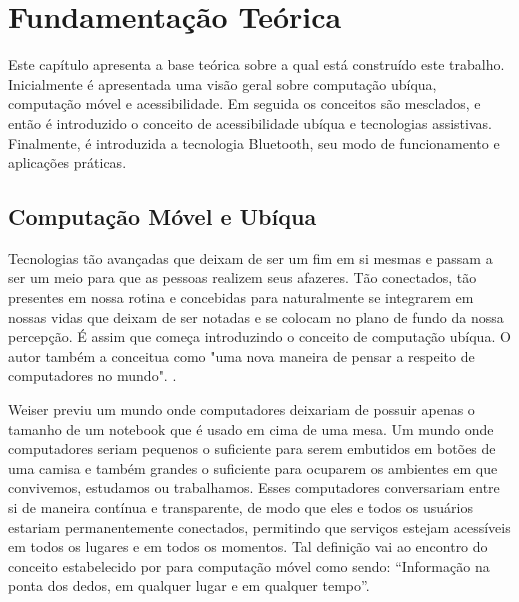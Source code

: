 \documentclass[english,brazilian]{UNISINOSmonografia}
\begin{document}
\chapter{Fundamentação Teórica}
Este capítulo apresenta a base teórica sobre a qual está construído este trabalho. Inicialmente é apresentada uma visão geral sobre computação ubíqua, computação móvel e acessibilidade. Em seguida os conceitos são mesclados, e então é introduzido o conceito de acessibilidade ubíqua e tecnologias assistivas. Finalmente, é introduzida a tecnologia Bluetooth, seu modo de funcionamento e aplicações práticas.

	\section{Computação Móvel e Ubíqua}
Tecnologias tão avançadas que deixam de ser um fim em si mesmas e passam a ser um meio para que as pessoas realizem seus afazeres. Tão conectados, tão presentes em nossa rotina e concebidas para naturalmente se integrarem em nossas vidas que deixam de ser notadas e se colocam no plano de fundo da nossa percepção. É assim que  começa introduzindo o conceito de computação ubíqua. O autor também a conceitua como "uma nova maneira de pensar a respeito de computadores no mundo". \cite{Weiser1991}.

Weiser previu um mundo onde computadores deixariam de possuir apenas o tamanho de um notebook que é usado em cima de uma mesa. Um mundo onde computadores seriam pequenos o suficiente para serem embutidos em botões de uma camisa e também grandes o suficiente para ocuparem os ambientes em que convivemos, estudamos ou trabalhamos. Esses computadores conversariam entre si de maneira contínua e transparente, de modo que eles e todos os usuários estariam permanentemente conectados, permitindo que serviços estejam acessíveis em todos os lugares e em todos os momentos. Tal definição vai ao encontro do conceito estabelecido por  para computação móvel como sendo: “Informação na ponta dos dedos, em qualquer lugar e em qualquer tempo”.
\end{document}
